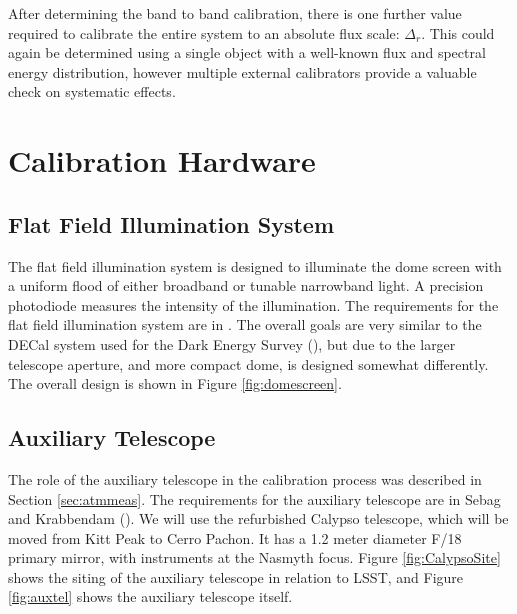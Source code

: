 \documentclass[12pt,preprint]{aastex}
\begin{document}
After determining the band to band calibration, there is one further
value required to calibrate the entire system to an absolute flux
scale: $\Delta_r$.  This could again be determined using a single
object with a well-known flux and spectral energy distribution,
however multiple external calibrators provide a valuable check on
systematic effects. 


 

\section{Calibration Hardware}
\label{sec:calib_hardware}

\subsection{Flat Field Illumination System}
The flat field illumination system is designed to illuminate the dome screen with a uniform flood of either 
broadband or tunable narrowband light.  A precision photodiode measures the intensity of the illumination.  
The requirements for the flat field illumination system are in \citep{LSE-60}.  The overall
goals are very similar to the DECal system used for the Dark Energy Survey (\citep{Marshall2013}), but due to the 
larger telescope aperture, and more compact dome, is designed somewhat differently.   The overall design is shown
in Figure \ref{fig:domescreen}.

\subsection{Auxiliary Telescope}

The role of the auxiliary telescope in the calibration process was described in Section \ref{sec:atmmeas}.
The requirements for the auxiliary telescope are in Sebag and Krabbendam (\citep{LSE-60}).  We will use
the refurbished Calypso telescope, which will be moved from Kitt Peak to Cerro Pachon.  It has a 1.2 meter
diameter F/18 primary mirror, with instruments at the Nasmyth focus.  Figure \ref{fig:CalypsoSite}
shows the siting of the auxiliary telescope in relation to LSST, and Figure \ref{fig:auxtel} shows the auxiliary
telescope itself.
\end{document}
